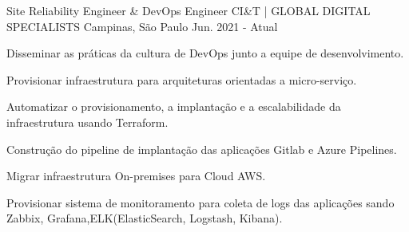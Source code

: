 

\begin{cventries}

  \cventry
    {Site Reliability Engineer \& DevOps Engineer} %
    {CI&T | GLOBAL DIGITAL SPECIALISTS} %
    {Campinas, São Paulo} %
    {Jun. 2021 - Atual} %
    {
      \begin{cvitems} %
        \item {Disseminar as práticas da cultura de DevOps junto a equipe de desenvolvimento.}
        \item {Provisionar infraestrutura para arquiteturas orientadas a micro-serviço.}
        \item {Automatizar o provisionamento, a implantação e a escalabilidade da infraestrutura usando Terraform.}
        \item {Construção do pipeline de implantação das aplicações Gitlab e Azure Pipelines.}
        \item {Migrar infraestrutura On-premises para Cloud AWS.}
        \item {Provisionar sistema de monitoramento para coleta de logs das aplicações sando
        Zabbix, Grafana,ELK(ElasticSearch, Logstash, Kibana).}
      \end{cvitems}
    }


\end{cventries}
